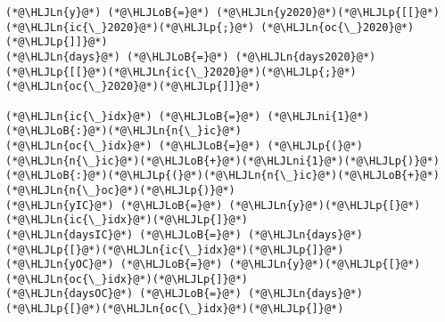 \documentclass[12pt,a4paper]{article}
\newcommand{\HLJLn}[1]{#1}
\newcommand{\HLJLni}[1]{\textcolor[RGB]{59,151,46}{#1}}
\newcommand{\HLJLoB}[1]{\textcolor[RGB]{102,102,102}{\textbf{#1}}}
\newcommand{\HLJLp}[1]{#1}
\begin{document}
\begin{lstlisting}
(*@\HLJLn{y}@*) (*@\HLJLoB{=}@*) (*@\HLJLn{y2020}@*)(*@\HLJLp{[[}@*)(*@\HLJLn{ic{\_}2020}@*)(*@\HLJLp{;}@*) (*@\HLJLn{oc{\_}2020}@*)(*@\HLJLp{]]}@*)
(*@\HLJLn{days}@*) (*@\HLJLoB{=}@*) (*@\HLJLn{days2020}@*)(*@\HLJLp{[[}@*)(*@\HLJLn{ic{\_}2020}@*)(*@\HLJLp{;}@*) (*@\HLJLn{oc{\_}2020}@*)(*@\HLJLp{]]}@*)

(*@\HLJLn{ic{\_}idx}@*) (*@\HLJLoB{=}@*) (*@\HLJLni{1}@*)(*@\HLJLoB{:}@*)(*@\HLJLn{n{\_}ic}@*)
(*@\HLJLn{oc{\_}idx}@*) (*@\HLJLoB{=}@*) (*@\HLJLp{(}@*)(*@\HLJLn{n{\_}ic}@*)(*@\HLJLoB{+}@*)(*@\HLJLni{1}@*)(*@\HLJLp{)}@*)(*@\HLJLoB{:}@*)(*@\HLJLp{(}@*)(*@\HLJLn{n{\_}ic}@*)(*@\HLJLoB{+}@*)(*@\HLJLn{n{\_}oc}@*)(*@\HLJLp{)}@*)
(*@\HLJLn{yIC}@*) (*@\HLJLoB{=}@*) (*@\HLJLn{y}@*)(*@\HLJLp{[}@*)(*@\HLJLn{ic{\_}idx}@*)(*@\HLJLp{]}@*)
(*@\HLJLn{daysIC}@*) (*@\HLJLoB{=}@*) (*@\HLJLn{days}@*)(*@\HLJLp{[}@*)(*@\HLJLn{ic{\_}idx}@*)(*@\HLJLp{]}@*)
(*@\HLJLn{yOC}@*) (*@\HLJLoB{=}@*) (*@\HLJLn{y}@*)(*@\HLJLp{[}@*)(*@\HLJLn{oc{\_}idx}@*)(*@\HLJLp{]}@*)
(*@\HLJLn{daysOC}@*) (*@\HLJLoB{=}@*) (*@\HLJLn{days}@*)(*@\HLJLp{[}@*)(*@\HLJLn{oc{\_}idx}@*)(*@\HLJLp{]}@*)


\end{lstlisting}
\end{document}
